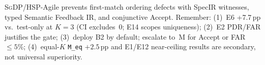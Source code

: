 \textsc{SgDP}/HSP-Agile prevents first-match ordering defects with SpecIR
witnesses, typed Semantic Feedback IR, and conjunctive Accept.
Remember: (1)~E6 +7.7\,pp vs.\ test-only at $K{=}3$ (CI excludes~0; E14 scopes
uniqueness); (2)~E2 PDR/FAR justifies the gate; (3)~deploy B2 by default;
escalate to~M for Accept or FAR${\le}5\%$; (4)~equal-$K$ \texttt{M\_eq}
${+}2.5$\,pp and E1/E12 near-ceiling results are secondary, not universal
superiority.
